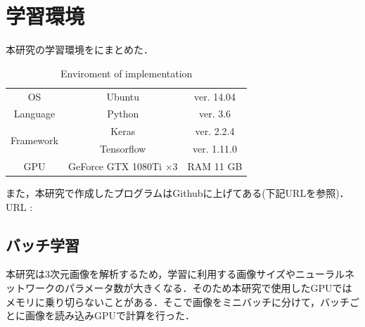 \section{学習環境}
本研究の学習環境をにまとめた．

\begin{table}[H]
	\centering
	\caption{Enviroment of implementation}
	\label{tab:環境}
	\begin{tabular}{ccc}\toprule
		OS & Ubuntu & ver. 14.04 \\ 
		Language & Python & ver. 3.6 \\ 
		\multirow{2}{*}{Framework} & Keras & ver. 2.2.4 \\ 
		& Tensorflow & ver. 1.11.0 \\ 
		GPU & GeForce GTX 1080Ti $\times$3 & RAM 11 GB \\  \bottomrule
	\end{tabular}
\end{table}

また，本研究で作成したプログラムはGithubに上げてある(下記URLを参照)．\\
URL : 


\subsection*{バッチ学習}
本研究は3次元画像を解析するため，学習に利用する画像サイズやニューラルネットワークのパラメータ数が大きくなる．そのため本研究で使用したGPUではメモリに乗り切らないことがある．そこで画像をミニバッチに分けて，バッチごとに画像を読み込みGPUで計算を行った．
